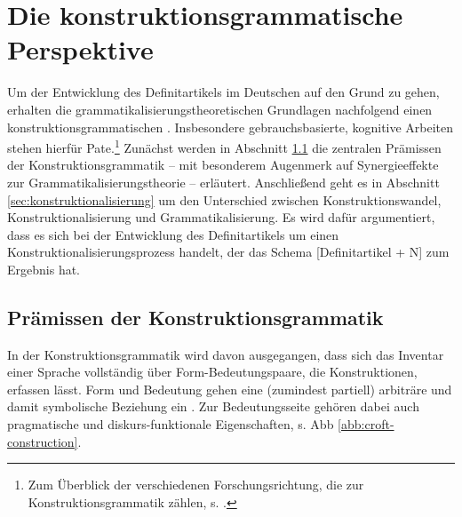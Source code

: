 \section{Die konstruktionsgrammatische Perspektive}\label{sec:kxg}
Um der Entwicklung des Definitartikels im Deutschen auf den Grund zu gehen, erhalten die grammatikalisierungstheoretischen Grundlagen nachfolgend einen konstruktionsgrammatischen . Insbesondere gebrauchsbasierte, kognitive  Arbeiten \parencite[u.a.][]{Langacker1987,Goldberg1995,Goldberg2006,Croft2002,Croft2004,Bybee2006,Bybee2010} stehen hierfür Pate.\footnote{Zum Überblick der verschiedenen Forschungsrichtung, die zur Konstruktionsgrammatik zählen, s. \textcite{Croft2004,Imo2007,Stefanowitsch2011,Hoffmann2013,Ziem2013}.} Zunächst werden in Abschnitt \ref{sec:kxg-grundlagen} die zentralen Prämissen der Konstruktionsgrammatik -- mit besonderem Augenmerk auf Synergieeffekte zur Grammatikalisierungstheorie -- erläutert. Anschließend geht es in Abschnitt \ref{sec:konstruktionalisierung} um den Unterschied zwischen Konstruktionswandel,  Konstruktionalisierung und Grammatikalisierung. Es wird dafür argumentiert, dass es sich bei der Entwicklung des Definitartikels um einen Konstruktionalisierungsprozess handelt, der das Schema [Definitartikel + N] zum Ergebnis hat.  

\subsection{Prämissen der Konstruktionsgrammatik}\label{sec:kxg-grundlagen}


In der Konstruktionsgrammatik wird davon ausgegangen, dass sich das Inventar einer Sprache vollständig über Form-Bedeutungspaare, die Konstruktionen, erfassen lässt. Form und Bedeutung gehen eine (zumindest partiell) arbiträre und damit symbolische Beziehung ein \parencite[257]{Croft2004}. Zur Bedeutungsseite gehören dabei auch pragmatische und diskurs-funktionale Eigenschaften, s. Abb \ref{abb:croft-construction}.  

